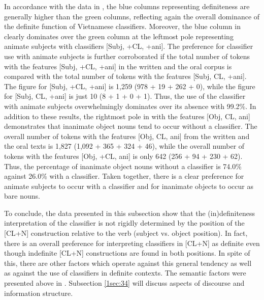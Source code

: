 \documentclass[output=paper]{langsci/langscibook}
\begin{document}
In accordance with the data in , the blue columns representing definiteness are generally higher than the green columns, reflecting again the overall dominance of the definite function of Vietnamese classifiers. Moreover, the blue column in  clearly dominates over the green column at the leftmost pole representing animate subjects with classifiers [Subj, +CL, +ani]. The preference for classifier use with animate subjects is further corroborated if the total number of tokens with the features [Subj, +CL, +ani] in the written and the oral corpus is compared with the total number of tokens with the features [Subj, \minus CL, +ani]. The figure for [Subj, +CL, +ani] is 1,259 (978 + 19 + 262 + 0), while the figure for [Subj, \minus CL, +ani] is just 10 (8 + 1 + 0 + 1). Thus, the use of the classifier with animate subjects overwhelmingly dominates over its absence with 99.2\%. In addition to these results, the rightmost pole in  with the features [Obj, \minus CL, \minus ani] demonstrates that inanimate object nouns tend to occur without a classifier. The overall number of tokens with the features [Obj, \minus CL, \minus ani] from the written and the oral texts is 1,827 (1,092 + 365 + 324 + 46), while the overall number of tokens with the features [Obj, +CL, \minus ani] is only 642 (256 + 94 + 230 + 62). Thus, the percentage of inanimate object nouns without a classifier is 74.0\% against 26.0\% with a classifier. Taken together, there is a clear preference for animate subjects to occur with a classifier and for inanimate objects to occur as bare nouns.

\largerpage
To conclude, the data presented in this subsection show that the (in)definite\-ness interpretation of the classifier is not rigidly determined by the position of the [CL+N] construction relative to the verb (subject vs. object position). In fact, there is an overall preference for interpreting classifiers in [CL+N] as definite even though indefinite [CL+N] constructions are found in both positions. In spite of this, there are other factors which operate against this general tendency as well as against the use of classifiers in definite contexts. The semantic factors were presented above in . Subsection \ref{1sec:34} will discuss aspects of discourse and information structure.
\end{document}
